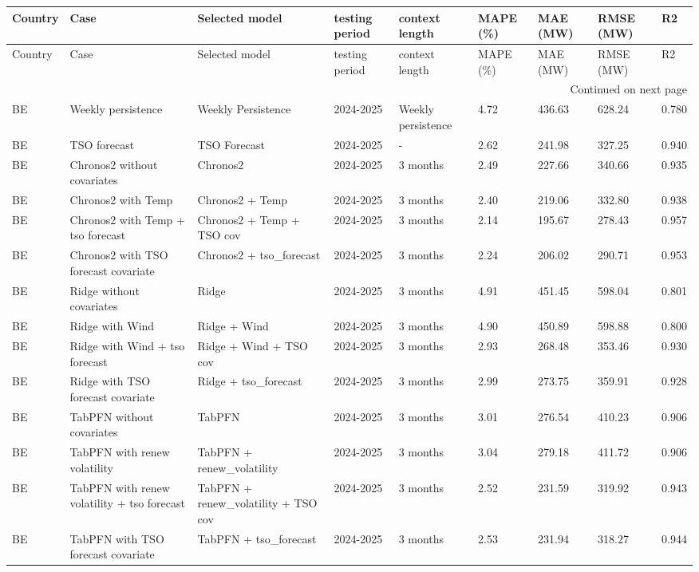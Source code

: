 \begin{longtable}{lllllllll}
\toprule
Country & Case & Selected model & testing period & context length & MAPE (\%) & MAE (MW) & RMSE (MW) & R2 \\
\midrule
\endfirsthead
\toprule
Country & Case & Selected model & testing period & context length & MAPE (\%) & MAE (MW) & RMSE (MW) & R2 \\
\midrule
\endhead
\midrule
\multicolumn{9}{r}{Continued on next page} \\
\midrule
\endfoot
\bottomrule
\endlastfoot
BE & Weekly persistence & Weekly Persistence & 2024-2025 & Weekly persistence & 4.72 & 436.63 & 628.24 & 0.780 \\
BE & TSO forecast & TSO Forecast & 2024-2025 & - & 2.62 & 241.98 & 327.25 & 0.940 \\
BE & Chronos2 without covariates & Chronos2 & 2024-2025 & 3 months & 2.49 & 227.66 & 340.66 & 0.935 \\
BE & Chronos2 with Temp & Chronos2 + Temp & 2024-2025 & 3 months & 2.40 & 219.06 & 332.80 & 0.938 \\
BE & Chronos2 with Temp + tso forecast & Chronos2 + Temp + TSO cov & 2024-2025 & 3 months & 2.14 & 195.67 & 278.43 & 0.957 \\
BE & Chronos2 with TSO forecast covariate & Chronos2 + tso\_forecast & 2024-2025 & 3 months & 2.24 & 206.02 & 290.71 & 0.953 \\
BE & Ridge without covariates & Ridge & 2024-2025 & 3 months & 4.91 & 451.45 & 598.04 & 0.801 \\
BE & Ridge with Wind & Ridge + Wind & 2024-2025 & 3 months & 4.90 & 450.89 & 598.88 & 0.800 \\
BE & Ridge with Wind + tso forecast & Ridge + Wind + TSO cov & 2024-2025 & 3 months & 2.93 & 268.48 & 353.46 & 0.930 \\
BE & Ridge with TSO forecast covariate & Ridge + tso\_forecast & 2024-2025 & 3 months & 2.99 & 273.75 & 359.91 & 0.928 \\
BE & TabPFN without covariates & TabPFN & 2024-2025 & 3 months & 3.01 & 276.54 & 410.23 & 0.906 \\
BE & TabPFN with renew volatility & TabPFN + renew\_volatility & 2024-2025 & 3 months & 3.04 & 279.18 & 411.72 & 0.906 \\
BE & TabPFN with renew volatility + tso forecast & TabPFN + renew\_volatility + TSO cov & 2024-2025 & 3 months & 2.52 & 231.59 & 319.92 & 0.943 \\
BE & TabPFN with TSO forecast covariate & TabPFN + tso\_forecast & 2024-2025 & 3 months & 2.53 & 231.94 & 318.27 & 0.944 \\

\end{longtable}
